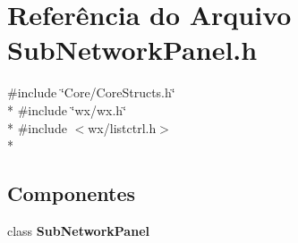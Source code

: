 \section{Referência do Arquivo Sub\+Network\+Panel.\+h}
\label{_sub_network_panel_8h}
{\ttfamily \#include \char`\"{}Core/\+Core\+Structs.\+h\char`\"{}}\\*
{\ttfamily \#include \char`\"{}wx/wx.\+h\char`\"{}}\\*
{\ttfamily \#include $<$wx/listctrl.\+h$>$}\\*
\subsection*{Componentes}
\begin{DoxyCompactItemize}
\item 
class {\bf Sub\+Network\+Panel}
\end{DoxyCompactItemize}
